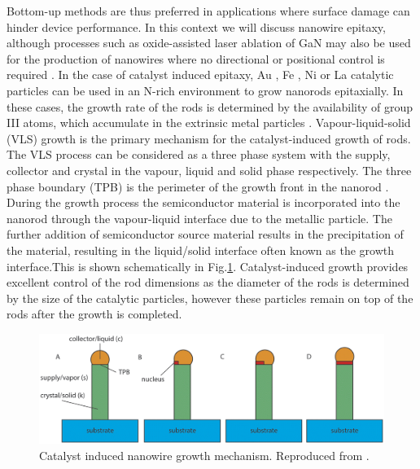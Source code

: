 Bottom-up methods are thus preferred in applications where surface damage can hinder device performance. In this context we will discuss nanowire epitaxy, although processes such as oxide-assisted laser ablation of GaN may also be used for the production of nanowires where no directional or positional control is required \cite{Shi2001}. In the case of catalyst induced epitaxy, Au \cite{Hou2011}, Fe \cite{Duan2000}, Ni \cite{Cheze2010} or La \cite{Chen2010} catalytic particles can be used in an N-rich environment to grow nanorods epitaxially. In these cases, the growth rate of the rods is determined by the availability of group III atoms, which accumulate in the extrinsic metal particles \cite{Geelhaar2007}. Vapour-liquid-solid   (VLS) growth is the primary mechanism for the catalyst-induced growth of rods. The VLS process can be considered as a three phase system with the supply, collector and crystal in the vapour, liquid and solid phase respectively. The three phase boundary  (TPB) is the perimeter of the growth front in the nanorod \cite{Chen2015}. During the growth process the semiconductor material is incorporated into the nanorod through the vapour-liquid interface due to the metallic particle. The further addition of semiconductor source material results in the precipitation of the material, resulting in the liquid/solid interface often known as the growth interface.This is shown schematically in Fig.\ref{VLS}. Catalyst-induced growth provides excellent control of the rod dimensions as the diameter of the rods is determined by the size of the catalytic particles, however these particles remain on top of the rods after the growth is completed.
\begin{figure}[h]
	\centering
	\includegraphics[width=1\textwidth]{Figs/Ch6/VLS}
	\caption {Catalyst induced nanowire growth mechanism. Reproduced from \cite{Chen2015}.}
	\label{VLS}
\end{figure}
\FloatBarrier

